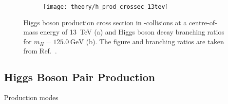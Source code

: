 \begin{figure}[htbp]
  \centering

  \begin{subfigure}[b]{0.47\textwidth}
    \centering

    \texttt{[image: theory/h\_prod\_crossec\_13tev]}

  \end{subfigure}\hfill%
  \begin{subfigure}[b]{0.47\textwidth}
    \centering

    \renewcommand{\arraystretch}{1.1}%
    

  \end{subfigure}

  \caption{Higgs boson production cross section in \pp-collisions at a
    centre-of-mass energy of \SI{13}{\TeV} (a) and Higgs boson decay branching
    ratios for $m_{H} = \SI{125.0}{\GeV}$ (b). The figure and branching ratios
    are taken from Ref.~\cite{deFlorian:2016spz}.}
\end{figure}


\subsection{Higgs Boson Pair Production}
\label{fig:theory_higgs_pair_prod}

Production modes

